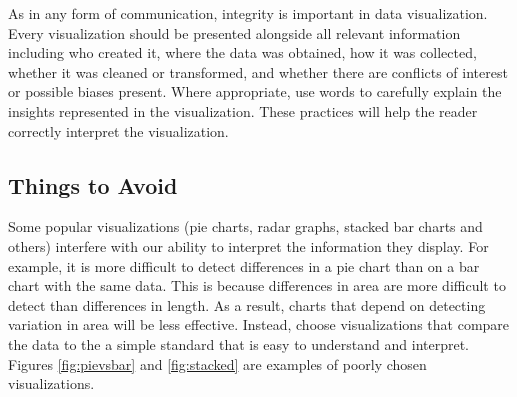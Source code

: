 As in any form of communication, integrity is important in data visualization.
Every visualization should be presented alongside all relevant information including who created it, where the data was obtained, how it was collected, whether it was cleaned or transformed, and whether there are conflicts of
interest or possible biases present.
Where appropriate, use words to carefully explain the insights represented
in the visualization.
These practices will help the reader correctly interpret the visualization.

\subsection*{Things to Avoid} %

Some popular visualizations (pie charts, radar graphs, stacked bar charts and others) interfere with our ability to interpret the information they display.
For example, it is more difficult to detect differences in a pie chart than on a bar chart with the same data.
This is because differences in area are more difficult to detect than differences in length.
As a result, charts that depend on detecting variation in area will be less effective.
Instead, choose visualizations that compare the data to the a simple standard that is easy to understand and interpret.
Figures \ref{fig:pievsbar} and \ref{fig:stacked} are examples of poorly chosen visualizations.

